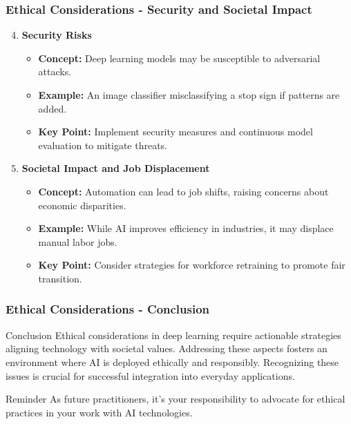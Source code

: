 \documentclass[aspectratio=169]{beamer}
\begin{document}
\begin{frame}[fragile]
    \frametitle{Ethical Considerations - Security and Societal Impact}
    \begin{enumerate}
        \setcounter{enumi}{3}
        \item \textbf{Security Risks}
        \begin{itemize}
            \item \textbf{Concept:} Deep learning models may be susceptible to adversarial attacks.
            \item \textbf{Example:} An image classifier misclassifying a stop sign if patterns are added.
            \item \textbf{Key Point:} Implement security measures and continuous model evaluation to mitigate threats.
        \end{itemize}

        \item \textbf{Societal Impact and Job Displacement}
        \begin{itemize}
            \item \textbf{Concept:} Automation can lead to job shifts, raising concerns about economic disparities.
            \item \textbf{Example:} While AI improves efficiency in industries, it may displace manual labor jobs.
            \item \textbf{Key Point:} Consider strategies for workforce retraining to promote fair transition.
        \end{itemize}
    \end{enumerate}
\end{frame}

\begin{frame}[fragile]
    \frametitle{Ethical Considerations - Conclusion}
    \begin{block}{Conclusion}
        Ethical considerations in deep learning require actionable strategies aligning technology with societal values. 
        Addressing these aspects fosters an environment where AI is deployed ethically and responsibly. 
        Recognizing these issues is crucial for successful integration into everyday applications.
    \end{block}
    
    \begin{block}{Reminder}
        As future practitioners, it's your responsibility to advocate for ethical practices in your work with AI technologies.
    \end{block}
\end{frame}
\end{document}
